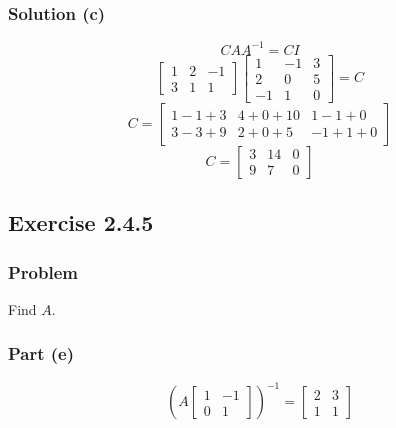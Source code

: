 \documentclass[12pt]{article}
\begin{document}
\subsubsection*{Solution (c)}
\[
  CAA^{-1} = CI 
\]
\[
  \begin{bmatrix}
    1 & 2 & -1\\ 
    3 & 1 & 1 
  \end{bmatrix}
  \begin{bmatrix}
    1 & -1 & 3\\ 
    2 & 0 & 5\\ 
    -1 & 1 & 0 
  \end{bmatrix}
  = C 
\]
\[
  C =
  \begin{bmatrix}
    1 - 1 + 3 & 4 + 0 + 10 & 1 - 1 + 0\\ 
    3 - 3 + 9 & 2 + 0 + 5 & -1 + 1 + 0 
  \end{bmatrix}
\]
\vspace{0.25in}
\[
  C = 
  \begin{bmatrix}
    3 & 14 & 0\\ 
    9 & 7 & 0 
  \end{bmatrix}
\]
\vspace{2in}
\subsection*{Exercise 2.4.5}
\vspace{0.25in}
\subsubsection*{Problem}
Find $A$. 
\vspace{0.25in}
\subsubsection*{Part (e)}
\[
  \left(
    A 
    \begin{bmatrix}
      1 & -1\\ 
      0 & 1 
    \end{bmatrix}
  \right)^{-1}
  = 
  \begin{bmatrix}
    2 & 3\\ 
    1 & 1 
  \end{bmatrix}
\]
\vspace{0.25in}
\end{document}
